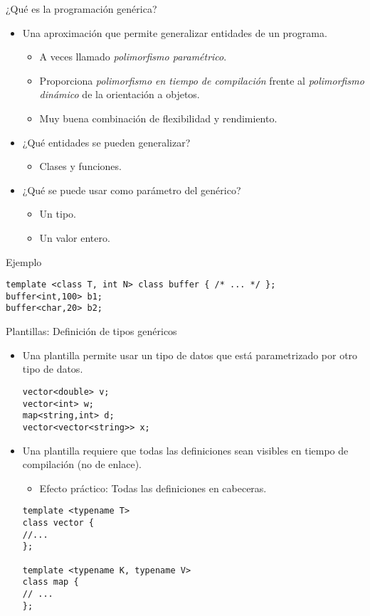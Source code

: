 \begin{frame}[t,fragile]{¿Qué es la programación genérica?}
\begin{itemize}
  \item Una aproximación que permite generalizar entidades de un programa.
    \begin{itemize}
      \item A veces llamado \emph{polimorfismo paramétrico}.
      \item Proporciona \emph{polimorfismo en tiempo de compilación} frente al
            \emph{polimorfismo dinámico} de la orientación a objetos.
      \item Muy buena combinación de flexibilidad y rendimiento.
    \end{itemize}
  \item ¿Qué entidades se pueden generalizar?
    \begin{itemize}
      \item Clases y funciones.
    \end{itemize}
  \item ¿Qué se puede usar como parámetro del genérico?
    \begin{itemize}
      \item Un tipo.
      \item Un valor entero.
    \end{itemize}
\end{itemize}
\begin{block}{Ejemplo}
\begin{lstlisting}[]
template <class T, int N> class buffer { /* ... */ };
buffer<int,100> b1;
buffer<char,20> b2;
\end{lstlisting}
\end{block}
\end{frame}

\begin{frame}[t,fragile]{Plantillas: Definición de tipos genéricos}
\begin{itemize}
  \item Una \alert{plantilla} permite usar un tipo de datos que está
        parametrizado por otro tipo de datos.
\begin{lstlisting}[]
vector<double> v;
vector<int> w;
map<string,int> d;
vector<vector<string>> x;
\end{lstlisting}
  \item Una plantilla requiere que todas las definiciones sean visibles
        en tiempo de compilación (no de enlace).
    \begin{itemize}
      \item Efecto práctico: Todas las definiciones en cabeceras.
    \end{itemize}
\begin{lstlisting}[]
template <typename T>
class vector {
//...
};

template <typename K, typename V>
class map {
// ...
};
\end{lstlisting}
\end{itemize}
\end{frame}

